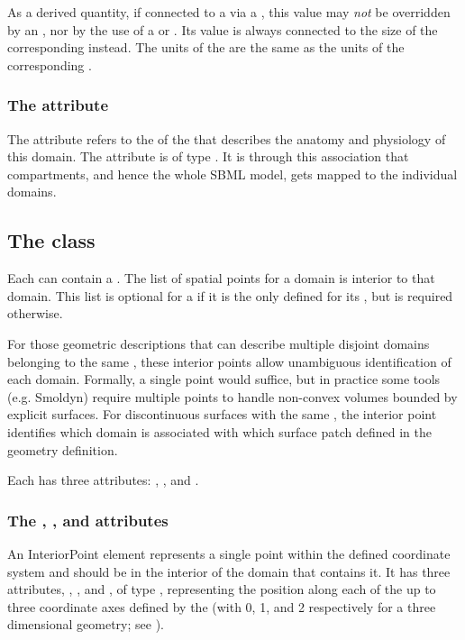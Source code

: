 As a derived quantity, if connected to a \Parameter via a \SpatialSymbolReference, this value may \emph{not} be overridden by an \InitialAssignment, nor by the use of a \Rule or \Event.  Its value is always connected to the size of the corresponding \Geometry instead.  The units of the \Domain are the same as the units of the corresponding \DomainType.

\subsubsection{The  attribute}
The  attribute refers to the  of the \DomainType that describes the anatomy and physiology of this domain. The attribute is of type . It is through this association that compartments, and hence the whole SBML model, gets mapped to the individual domains. 


\subsection{The  class}
\label{InteriorPoint-class}
Each \Domain can contain a \ListOfInteriorPoints. The list of spatial points for a domain is interior to that domain.  This list is optional for a \Domain if it is the only \Domain defined for its \DomainType, but is required otherwise.

For those geometric descriptions that can describe multiple disjoint domains belonging to the same , these interior points allow unambiguous identification of each domain.  Formally, a single point would suffice, but in practice some tools (e.g. Smoldyn) require multiple points to handle non-convex volumes bounded by explicit surfaces.  For discontinuous surfaces with the same , the interior point identifies which domain is associated with which surface patch defined in the geometry definition.

Each \InteriorPoint has three attributes: , , and . 

\subsubsection{The , , and  attributes}
An InteriorPoint element represents a single point within the defined coordinate system and should be in the interior of the domain that contains it. It has three attributes, , , and , of type , representing the position along each of the up to three coordinate axes defined by the \CoordinateComponents (with  0, 1, and 2 respectively for a three dimensional geometry; see ).

